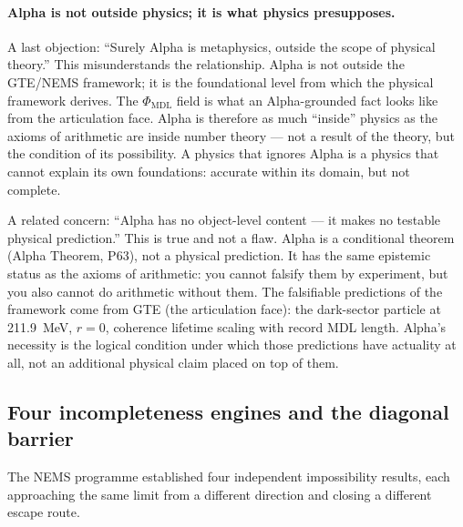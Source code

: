 \documentclass[11pt]{article}
\theoremstyle{remark}
\newcommand{\PHIMDL}{\Phi_{\mathrm{MDL}}}
\begin{document}
\paragraph{Alpha is not outside physics; it is what physics presupposes.}
A last objection: ``Surely Alpha is metaphysics, outside the scope of physical
theory.'' This misunderstands the relationship. Alpha is not outside the GTE/NEMS
framework; it is the foundational level from which the physical framework derives.
The $\PHIMDL$ field is what an Alpha-grounded fact looks like from the articulation
face. Alpha is therefore as much ``inside'' physics as the axioms of arithmetic are
inside number theory --- not a result of the theory, but the condition of its
possibility. A physics that ignores Alpha is a physics that cannot explain its own
foundations: accurate within its domain, but not complete.

A related concern: ``Alpha has no object-level content --- it makes no testable
physical prediction.'' This is true and not a flaw. Alpha is a conditional theorem
(Alpha Theorem, P63), not a physical prediction. It has the same epistemic status as
the axioms of arithmetic: you cannot falsify them by experiment, but you also cannot
do arithmetic without them. The falsifiable predictions of the framework come from GTE
(the articulation face): the dark-sector particle at 211.9~MeV, $r=0$, coherence
lifetime scaling with record MDL length. Alpha's necessity is the logical condition
under which those predictions have actuality at all, not an additional physical claim
placed on top of them.

\subsection{Four incompleteness engines and the diagonal barrier}

The NEMS programme established four independent impossibility results, each approaching
the same limit from a different direction and closing a different escape route.
\end{document}
